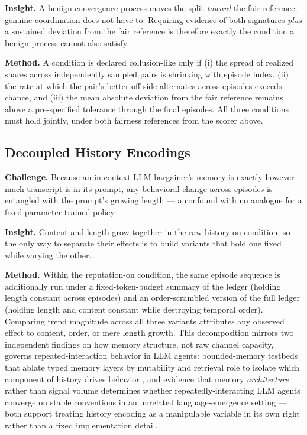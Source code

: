 \documentclass[11pt]{article}
\begin{document}
\textbf{Insight.} A benign convergence process moves the split \emph{toward} the fair reference; genuine coordination does not have to. Requiring evidence of both signatures \emph{plus} a sustained deviation from the fair reference is therefore exactly the condition a benign process cannot also satisfy.

\textbf{Method.} A condition is declared collusion-like only if (i) the spread of realized shares across independently sampled pairs is shrinking with episode index, (ii) the rate at which the pair's better-off side alternates across episodes exceeds chance, and (iii) the mean absolute deviation from the fair reference remains above a pre-specified tolerance through the final episodes. All three conditions must hold jointly, under both fairness references from the scorer above.

\subsection{Decoupled History Encodings}
\textbf{Challenge.} Because an in-context LLM bargainer's memory is exactly however much transcript is in its prompt, any behavioral change across episodes is entangled with the prompt's growing length --- a confound with no analogue for a fixed-parameter trained policy.

\textbf{Insight.} Content and length grow together in the raw history-on condition, so the only way to separate their effects is to build variants that hold one fixed while varying the other.

\textbf{Method.} Within the reputation-on condition, the same episode sequence is additionally run under a fixed-token-budget summary of the ledger (holding length constant across episodes) and an order-scrambled version of the full ledger (holding length and content constant while destroying temporal order). Comparing trend magnitude across all three variants attributes any observed effect to content, order, or mere length growth. This decomposition mirrors two independent findings on how memory structure, not raw channel capacity, governs repeated-interaction behavior in LLM agents: bounded-memory testbeds that ablate typed memory layers by mutability and retrieval role to isolate which component of history drives behavior \citep{agenticsts2607}, and evidence that memory \emph{architecture} rather than signal volume determines whether repeatedly-interacting LLM agents converge on stable conventions in an unrelated language-emergence setting \citep{memoryarchlangemergence2607} --- both support treating history encoding as a manipulable variable in its own right rather than a fixed implementation detail.
\end{document}
